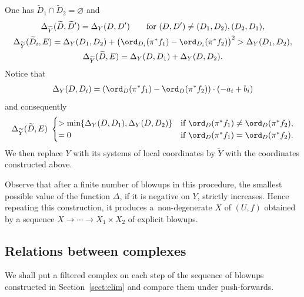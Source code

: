 One has $\widetilde{D}_1\cap\widetilde{D}_2 = \varnothing$ and
\begin{gather*}
\Delta_{\widetilde{Y}}(\widetilde{D},\widetilde{D}') = \Delta_Y(D,D') \qquad \text{for $(D,D') \neq (D_1,D_2), (D_2,D_1)$}, \\
\Delta_{\widetilde{Y}}(\widetilde{D}_i,E) = \Delta_Y(D_1,D_2) + \big(\ord_{D_i}(\pi^*f_1)-\ord_{D_i}(\pi^*f_2)\big)^2	> \Delta_Y(D_1,D_2), \\
\Delta_{\widetilde{Y}}(\widetilde{D},E)= \Delta_Y(D,D_1) + \Delta_Y(D,D_2).
\end{gather*}
Notice that
\begin{gather*} \Delta_Y(D,D_i) = \left(\ord_D(\pi^*f_1) -\ord_D(\pi^*f_2)\right)\cdot (-a_i+b_i) \end{gather*}
and consequently
\begin{gather*} \Delta_{\widetilde{Y}}(\widetilde{D},E) \ \begin{cases}
> \min\{\Delta_Y(D,D_1),\Delta_Y(D,D_2)\} & \text{if $\ord_D(\pi^*f_1) \neq \ord_D(\pi^*f_2)$}, \\
= 0 & \text{if $\ord_D(\pi^*f_1) = \ord_D(\pi^*f_2)$}.
\end{cases} \end{gather*}
We then replace $Y$ with its systems of local coordinates by $\widetilde{Y}$ with the coordinates constructed above.

Observe that after a finite number of blowups in this procedure, the smallest possible value of the function $\Delta$, if it is negative on $Y$, strictly increases. Hence repeating this construction, it produces a~non-degenerate {\cpt} $X$ of $(U,f)$ obtained by a sequence $X \to\cdots\to X_1\times X_2$ of explicit blowups.

\subsection{Relations between complexes}\label{sect:relations}
We shall put a filtered complex on each step of the sequence of blowups constructed in Section~\ref{sect:elim} and compare them under push-forwards.

